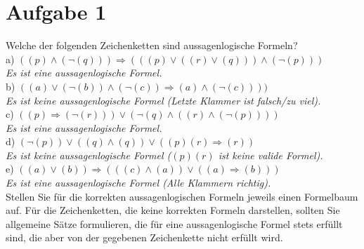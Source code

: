 \section*{Aufgabe 1}

Welche der folgenden Zeichenketten sind aussagenlogische Formeln?\\

a) $((p) \land (\lnot(q))) \Rightarrow (((p) \lor ((r) \lor (q))) \land (\lnot (p)))$\\

\textit{Es ist eine aussagenlogische Formel.}\\

b) $((a) \lor (\lnot (b)) \land (\lnot (c)) \Rightarrow (a) \land (\lnot(c))))$\\

\textit{Es ist keine aussagenlogische Formel (Letzte Klammer ist falsch/zu viel).}\\

c) $((p) \Rightarrow (\lnot (r))) \lor (\lnot (q) \land ((r) \land (\lnot (p))))$\\

\textit{Es ist eine aussagenlogische Formel.}\\

d) $(\lnot (p)) \lor ((q) \land (q)) \lor ((p)(r) \Rightarrow (r))$\\

\textit{Es ist keine aussagenlogische Formel ($(p)(r)$ ist keine valide Formel).}\\

e) $((a) \lor (b)) \Rightarrow (((c) \land (a)) \lor ((a) \Rightarrow (b)))$\\

\textit{Es ist eine aussagenlogische Formel (Alle Klammern richtig).}\\

Stellen Sie für die korrekten aussagenlogischen Formeln jeweils einen Formelbaum auf. Für die
Zeichenketten, die keine korrekten Formeln darstellen, sollten Sie allgemeine Sätze formulieren, die für eine aussagenlogische Formel stets erfüllt sind, die aber von der gegebenen Zeichenkette nicht erfüllt wird.